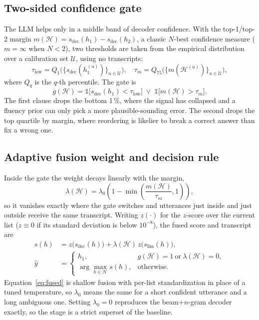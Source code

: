 \documentclass[conference,a4paper,10pt]{IEEEtran}
\newcommand{\pct}{\,\%}
\begin{document}
\subsection{Two-sided confidence gate}
The LLM helps only in a middle band of decoder confidence. With the top-1/top-2
margin $m(\mathcal{H})=s_{\text{dec}}(h_1)-s_{\text{dec}}(h_2)$, a classic
$N$-best confidence measure \cite{jiang2005confidence} ($m=\infty$ when $N<2$),
two thresholds are taken from the empirical distribution over a calibration set
$\mathcal{U}$, using no transcripts:
\begin{equation}\label{eq:thresh}
\tau_{\text{low}}=Q_{1}\big(\{s_{\text{dec}}(h_1^{(u)})\}_{u\in\mathcal{U}}\big),\quad
\tau_{m}=Q_{75}\big(\{m(\mathcal{H}^{(u)})\}_{u\in\mathcal{U}}\big),
\end{equation}
where $Q_q$ is the $q$-th percentile. The gate is
\begin{equation}\label{eq:gate}
g(\mathcal{H})=\mathbb{1}\big[s_{\text{dec}}(h_1)<\tau_{\text{low}}\big]\;\vee\;\mathbb{1}\big[m(\mathcal{H})>\tau_{m}\big].
\end{equation}
The first clause drops the bottom 1\pct{}, where the signal has collapsed and a
fluency prior can only pick a more plausible-sounding error. The second drops the
top quartile by margin, where reordering is likelier to break a correct answer
than fix a wrong one.

\subsection{Adaptive fusion weight and decision rule}
Inside the gate the weight decays linearly with the margin,
\begin{equation}\label{eq:lambda}
\lambda(\mathcal{H})=\lambda_0\left(1-\min\!\left(\frac{m(\mathcal{H})}{\tau_m},1\right)\right),
\end{equation}
so it vanishes exactly where the gate switches and utterances just inside and
just outside receive the same transcript. Writing $z(\cdot)$ for the $z$-score
over the current list ($z\equiv0$ if its standard deviation is below
$10^{-8}$), the fused score and transcript are
\begin{align}
s(h) &= z\big(s_{\text{dec}}(h)\big)+\lambda(\mathcal{H})\,z\big(s_{\text{llm}}(h)\big),\label{eq:fused}\\
\hat{y} &=
\begin{cases}
h_1, & g(\mathcal{H})=1 \ \text{or}\ \lambda(\mathcal{H})=0,\\[2pt]
\arg\max_{h\in\mathcal{H}} s(h), & \text{otherwise.}
\end{cases}\label{eq:decision}
\end{align}
Equation~\eqref{eq:fused} is shallow fusion \cite{kannan2018shallow} with
per-list standardization in place of a tuned temperature, so $\lambda_0$ means
the same for a short confident utterance and a long ambiguous one. Setting
$\lambda_0=0$ reproduces the beam$+n$-gram decoder exactly, so the stage is a
strict superset of the baseline.
\end{document}
